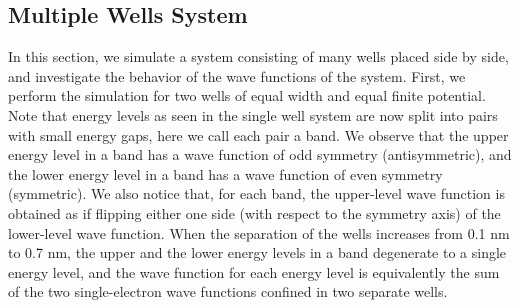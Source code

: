 \documentclass[11pt]{book}
\theoremstyle{break}
\theoremstyle{break}
\begin{document}
\subsection{Multiple Wells System}
In this section, we simulate a system consisting of many wells placed side by side, and investigate the behavior of the wave functions of the system. First, we perform the simulation for two wells of equal width and equal finite potential. Note that energy levels as seen in the single well system are now split into pairs with small energy gaps, here we call each pair a band. We observe that the upper energy level in a band has a wave function of odd symmetry (antisymmetric), and the lower energy level in a band has a wave function of even symmetry (symmetric). We also notice that, for each band, the upper-level wave function is obtained as if flipping either one side (with respect to the symmetry axis) of the lower-level wave function. When the separation of the wells increases from 0.1 nm to 0.7 nm, the upper and the lower energy levels in a band degenerate to a single energy level, and the wave function for each energy level is equivalently the sum of the two single-electron wave functions confined in two separate wells.
\end{document}
